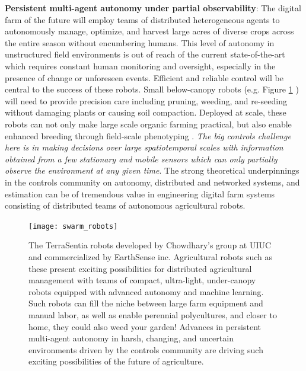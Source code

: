 \textbf{Persistent multi-agent autonomy under partial observability}:  The digital farm of the future will employ teams of distributed heterogeneous agents to autonomously manage, optimize, and harvest large acres of diverse crops across the entire season without encumbering humans. This level of autonomy in unstructured field environments is out of reach of the current state-of-the-art which requires constant human monitoring and oversight, especially in the presence of change or unforeseen events. Efficient and reliable control will be central to the success of these robots. Small below-canopy robots (e.g. Figure \ref{fig:terrasentia} \cite{kayacan2018embedded}) will need to provide precision care including pruning, weeding, and re-seeding without damaging plants or causing soil compaction. Deployed at scale, these robots can not only make large scale organic farming practical, but also enable enhanced breeding through  field-scale phenotyping \cite{kayacan2018embedded,mueller2017robotanist,virlet2017field}. \textit{The big controls challenge here is in making decisions over large spatiotemporal scales with information obtained from a few stationary and mobile sensors which can only partially observe the environment at any given time}. The strong theoretical underpinnings in the controls community on autonomy, distributed and networked systems, and estimation can be of tremendous value in engineering digital farm systems consisting of distributed  teams of autonomous agricultural robots.  %

\begin{figure}
\texttt{[image: swarm\_robots]}
\caption{The TerraSentia robots developed by Chowdhary's group at UIUC and commercialized by EarthSense inc. Agricultural robots such as these present exciting possibilities for distributed agricultural management with teams of compact, ultra-light, under-canopy robots equipped with advanced autonomy and machine learning. Such robots can fill the niche between large farm equipment and manual labor, as well as enable perennial polycultures, and closer to home,  they could also weed your garden! Advances in persistent multi-agent autonomy in harsh, changing, and uncertain environments driven by the controls community are driving such exciting possibilities of the future of agriculture.}
\label{fig:terrasentia}
\end{figure}



